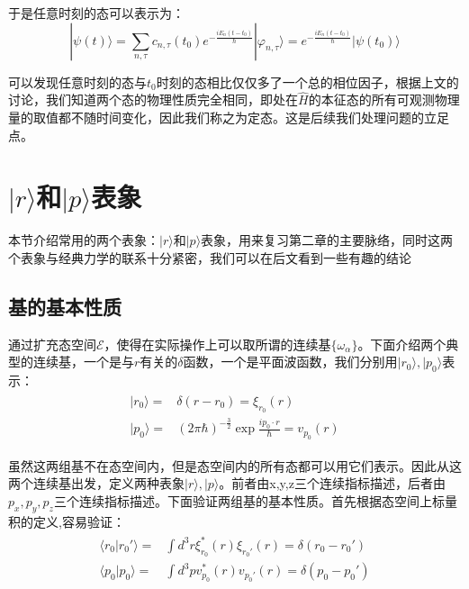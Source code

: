         于是任意时刻的态可以表示为：
        \begin{equation}
            |\psi(t)\rangle=\sum_{n,\tau}c_{n,\tau}(t_0)e^{-\frac{iE_n(t-t_0)}{\hbar}}|\varphi_{n,\tau}\rangle=e^{-\frac{iE_n(t-t_0)}{\hbar}}|\psi(t_0)\rangle
        \end{equation}
        
        可以发现任意时刻的态与$t_0$时刻的态相比仅仅多了一个总的相位因子，根据上文的讨论，我们知道两个态的物理性质完全相同，即处在$\hat{H}$的本征态的所有可观测物理量的取值都不随时间变化，因此我们称之为定态。这是后续我们处理问题的立足点。
        
\section{$|r\rangle$和$|p\rangle$表象}
    本节介绍常用的两个表象：$|r\rangle$和$|p\rangle$表象，用来复习第二章的主要脉络，同时这两个表象与经典力学的联系十分紧密，我们可以在后文看到一些有趣的结论
    \subsection{基的基本性质}
    通过扩充态空间$\mathscr{E}$，使得在实际操作上可以取所谓的连续基$\{\omega_\alpha\}$。下面介绍两个典型的连续基，一个是与$r$有关的$\delta$函数，一个是平面波函数，我们分别用$|r_0\rangle,|p_0\rangle$表示：
    \begin{align}
        \begin{split}
            |r_0\rangle=&\delta(r-r_0)=\xi_{r_0}(r)\\
            |p_0\rangle=&(2\pi\hbar)^{-\frac{3}{2}}\exp{\frac{ip_0\cdot r}{\hbar}}=v_{p_0}(r)
        \end{split}
    \end{align}
    
    虽然这两组基不在态空间内，但是态空间内的所有态都可以用它们表示。因此从这两个连续基出发，定义两种表象$|r\rangle,|p\rangle$。前者由x,y,z三个连续指标描述，后者由$p_x,p_y,p_z$三个连续指标描述。下面验证两组基的基本性质。首先根据态空间上标量积的定义,容易验证：
    \begin{align}
        \begin{split}
            \langle r_0|r_0'\rangle=&\int d^3r\xi^*_{r_0}(r)\xi_{r_0'}(r)=\delta(r_0-r_0')\\
            \langle p_0|p_0\rangle=&\int d^3p v^*_{p_0}(r)v_{p_0'}(r)=\delta(p_0-p_0')
        \end{split}
    \end{align}
    
